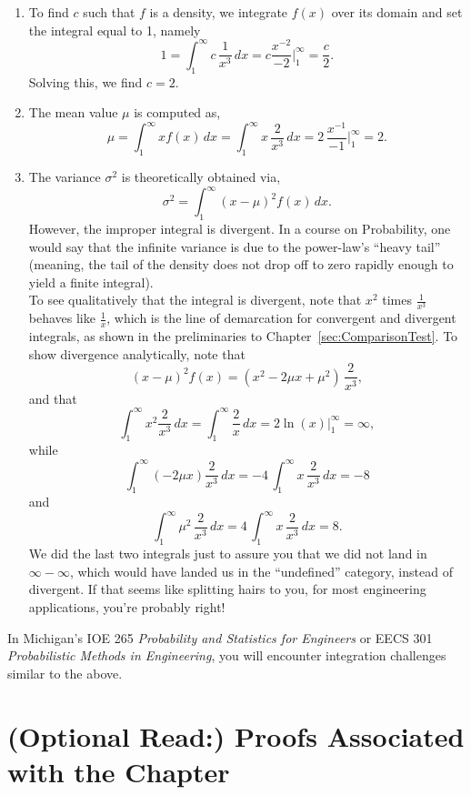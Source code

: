 \solution
\begin{enumerate}
\renewcommand{\labelenumi}{(\alph{enumi})}
\item To find $c$ such that $f$ is a density, we integrate $f(x)$ over its domain and set the integral equal to 1, namely
\[ 1 = \int_{1}^{\infty} c \, \frac{1}{x^3} \, dx = c \frac{x^{-2}}{-2} \Bigg|_{1}^{\infty}  = \frac{c}{2}.\]
Solving this, we find $c = 2$.

\item The mean value $\mu$ is computed as,
 \[ \mu = \int_{1}^{\infty} x f(x) \, dx = \int_{1}^{\infty} x \, \frac{2}{x^3} \, dx  = 2 \, \frac{ x^{-1} }{-1} \Bigg|_{1}^{\infty} = 2. \]

\item The variance $\sigma^2$ is theoretically obtained  via,
\[ \sigma^2 = \int_{1}^{\infty} (x - \mu)^2 f(x) \, dx.\]
However, the improper integral is divergent. In a course on Probability, one would say that the infinite variance is due to the power-law's ``heavy tail'' (meaning, the tail of the density does not drop off to zero rapidly enough to yield a finite integral). \\

To see qualitatively that the integral is divergent, note that $x^2$ times $\frac{1}{x^3}$ behaves like $\frac{1}{x}$, which is the line of demarcation for convergent and divergent integrals, as shown in the preliminaries to Chapter~\ref{sec:ComparisonTest}.  To show divergence analytically, note that
$$ (x - \mu)^2 f(x) = \left(x^2 - 2 \mu x + \mu^2  \right) \, \frac{2}{x^3},$$
and that
$$ \int_1^\infty x^2 \frac{2}{x^3} \, dx = \int_1^\infty \frac{2}{x} \, dx = 2 \ln(x) \Big|_1^\infty = \infty,$$
while $$  \int_1^\infty (- 2 \mu x ) \frac{2}{x^3} \, dx =  -4 \, \int_1^\infty x \, \frac{2}{x^3} \, dx = -8$$
and
$$ \int_1^\infty \mu^2 \,  \frac{2}{x^3} \, dx = 4 \, \int_1^\infty x \, \frac{2}{x^3} \, dx = 8.$$
We did the last two integrals just to assure you that we did not land in $\infty - \infty$, which would have landed us in the ``undefined'' category, instead of divergent. If that seems like splitting hairs to you, for most engineering applications, you're probably right!
\end{enumerate}
\Qed

In Michigan's IOE 265 \textit{Probability and Statistics for Engineers} or EECS 301 \textit{Probabilistic Methods in Engineering}, you will encounter integration challenges similar to the above.


\section{(Optional Read:) Proofs Associated with the Chapter}

